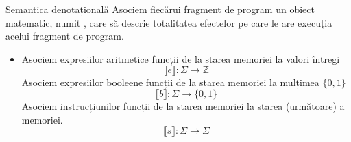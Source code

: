 \documentclass[xcolor=pdftex,romanian,colorlinks]{beamer}
\begin{document}
\begin{frame}{Semantica denotațională}
Asociem fiecărui fragment de program un obiect matematic, numit ,
care să descrie totalitatea efectelor pe care le are execuția acelui fragment de program.
\begin{itemize}
\item Asociem expresiilor aritmetice funcții de la starea memoriei la valori întregi
$$\llbracket e \rrbracket : \Sigma \to \mathbb{Z}$$
\vitem Asociem expresiilor booleene funcții de la starea memoriei la mulțimea $\{0, 1\}$
$$\llbracket b \rrbracket : \Sigma \to \{0, 1\}$$
\vitem Asociem instrucțiunilor funcții de la starea memoriei la starea (următoare) a memoriei.
$$\llbracket s \rrbracket : \Sigma \to \Sigma$$
\end{itemize}


\end{frame}
\end{document}
